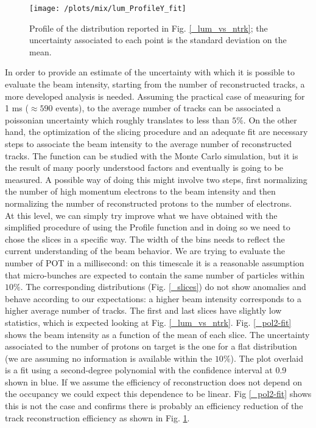 \documentclass[12pt,a4paper,openright, oneside, titlepage]{book} %
\begin{document}
\begin{figure}[!htb]
\centering
\texttt{[image: /plots/mix/lum\_ProfileY\_fit]}
\caption[Protons on target and number of tracks (ProfileY)]
{Profile of the distribution reported in Fig. \ref{_lum_vs_ntrk}; 
the uncertainty associated to each point is the standard deviation on the mean.}
\label{_lum_ProfileY}
\end{figure}

\noindent In order to provide an estimate of the uncertainty with which it is possible to evaluate the beam intensity, starting from the number of reconstructed tracks, a more developed analysis is needed.
Assuming the practical case of measuring for 1 ms ($\approx590$ events), to the average number of tracks can be associated a poissonian uncertainty which roughly translates to less than $5\%$. 
On the other hand, the optimization of the slicing procedure and an adequate fit are necessary steps to associate the beam intensity to the average number of reconstructed tracks.
The function can be studied with the Monte Carlo simulation, but it is the result of many poorly understood factors and eventually is going to be measured.
A possible way of doing this might involve two steps, first normalizing the number of high momentum electrons to the beam intensity and then normalizing the number of reconstructed protons to the number of electrons.\\

\noindent At this level, we can simply try improve what we have obtained with the simplified procedure of using the Profile function and in doing so we need to chose the slices in a specific way. 
The width of the bins needs to reflect the current understanding of the beam behavior.
We are trying to evaluate the number of POT in a millisecond: on this timescale it is a reasonable assumption that micro-bunches are expected to contain the same number of particles within $10\%$. 
The corresponding distributions (Fig. \ref{_slices}) do not show anomalies and behave according to our expectations: a higher beam intensity corresponds to a higher average number of tracks.
The first and last slices have slightly low statistics, which is expected looking at Fig. \ref{_lum_vs_ntrk}.
Fig. \ref{_pol2-fit} shows the beam intensity as a function of the mean of each slice. 
The uncertainty associated to the number of protons on target is the one for a flat distribution (we are assuming no information is available within the $10\%$).
The plot overlaid is a fit using a second-degree polynomial with the confidence interval at 0.9 shown in blue. 
If we assume the efficiency of reconstruction does not depend on the occupancy we could expect this dependence to be linear. 
Fig \ref{_pol2-fit} shows this is not the case and confirms there is probably an efficiency reduction of the track reconstruction efficiency as shown in Fig. \ref{_lum_ProfileY}.\\
\end{document}
